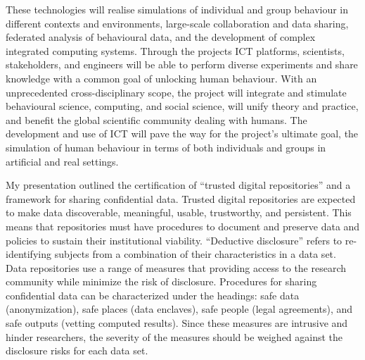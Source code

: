 \documentclass[a4paper,USenglish]{dagrep}
\begin{document}
These technologies will realise simulations of individual and group behaviour in
different contexts and environments, large-scale collaboration and data sharing,
federated analysis of behavioural data, and the development of complex
integrated computing systems. Through the projects ICT platforms, scientists,
stakeholders, and engineers will be able to perform diverse experiments and
share knowledge with a common goal of unlocking human behaviour. With an
unprecedented cross-disciplinary scope, the project will integrate and stimulate
behavioural science, computing, and social science, will unify theory and
practice, and benefit the global scientific community dealing with humans. The
development and use of ICT will pave the way for the project's ultimate goal,
the simulation of human behaviour in terms of both individuals and groups in
artificial and real settings. 


{}
\license
My presentation outlined the certification of ``trusted digital repositories'' and a framework for 
sharing confidential data.  Trusted digital repositories are expected to make data discoverable, 
meaningful, usable, trustworthy, and persistent.  This means that repositories must have 
procedures to document and preserve data and policies to sustain their institutional viability.   
``Deductive disclosure'' refers to re-identifying subjects from a combination of their 
characteristics in a data set.  Data repositories use a range of measures that providing access 
to the research community while minimize the risk of disclosure.  Procedures for sharing 
confidential data can be characterized under the headings: safe data (anonymization), safe 
places (data enclaves), safe people (legal agreements), and safe outputs (vetting computed 
results).   Since these measures are intrusive and hinder researchers, the severity of the 
measures should be weighed against the disclosure risks for each data set. 
  
\end{document}
